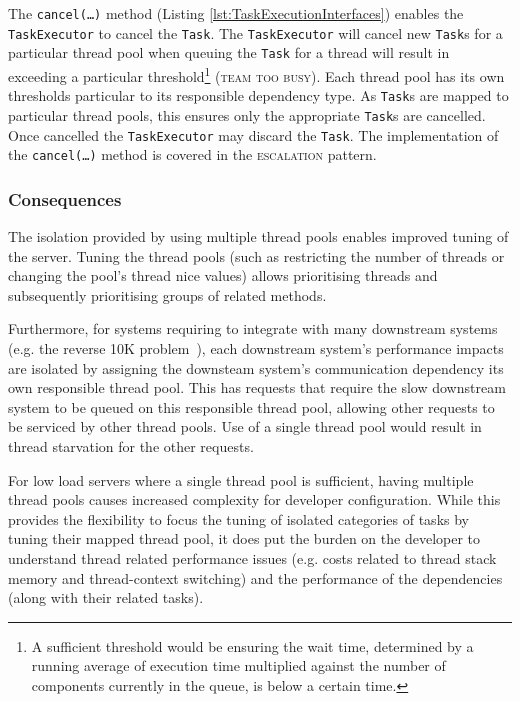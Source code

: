 \documentclass[prodmode]{style/acmlarge}
\begin{document}
The \texttt{cancel(\ldots)} method (Listing \ref{lst:TaskExecutionInterfaces})
enables the \texttt{TaskExecutor} to cancel the \texttt{Task}. The
\texttt{Task\-Executor} will cancel new \texttt{Task}s for a particular thread
pool when queuing the \texttt{Task} for a thread will result in exceeding a
particular threshold\footnote{A sufficient threshold would be ensuring the wait
time, determined by a running average of execution time multiplied against the
number of components currently in the queue, is below a certain time.}
(\textsc{team too busy}).  Each thread pool has its own thresholds particular to
its responsible dependency type.  As \texttt{Task}s are mapped to particular
thread pools, this ensures only the appropriate \texttt{Task}s are cancelled.
Once cancelled the \texttt{TaskExecutor} may discard the \texttt{Task}.  The
implementation of the \texttt{can\-cel(\ldots)} method is covered in the
\textsc{escalation} pattern.


\subsubsection*{Consequences}

The isolation provided by using multiple thread pools enables improved tuning of
the server.  Tuning the thread pools (such as restricting the number of threads
or changing the pool's thread nice values) allows prioritising threads and
subsequently prioritising groups of related methods.

Furthermore, for systems requiring to integrate with many downstream systems
(e.g. the reverse 10K problem~\cite{reverse-ten-k-problem}), each downstream
system's performance impacts are isolated by assigning the downsteam system's
communication dependency its own responsible thread pool.  This has requests
that require the slow downstream system to be queued on this responsible thread
pool, allowing other requests to be serviced by other thread pools.  Use of a
single thread pool would result in thread starvation for the other requests.

For low load servers where a single thread pool is sufficient, having multiple
thread pools causes increased complexity for developer configuration.  While
this provides the flexibility to focus the tuning of isolated categories of
tasks by tuning their mapped thread pool, it does put the burden on the
developer to understand thread related performance issues (e.g. costs related to
thread stack memory and thread-context switching) and the performance of the
dependencies (along with their related tasks).
\end{document}
